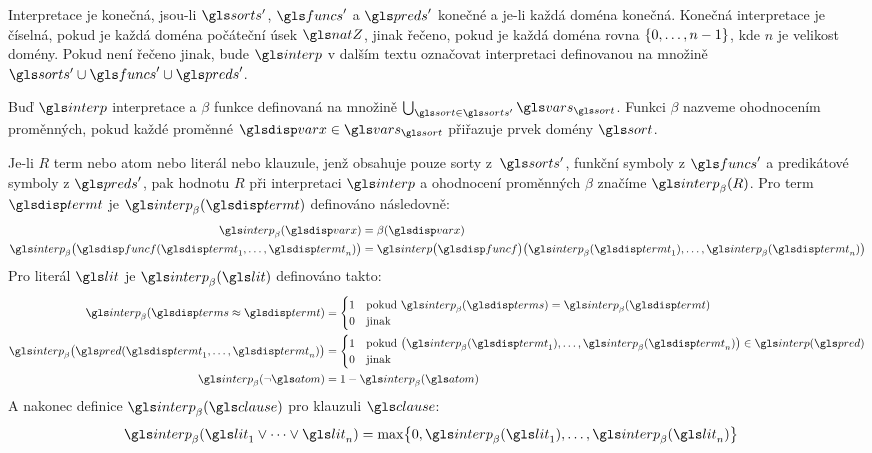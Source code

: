 Interpretace je konečná, jsou-li $\sorts'$, $\funcs'$ a $\preds'$
konečné a je-li každá doména konečná.
Konečná interpretace je číselná, pokud je každá doména
počáteční úsek $\natZ$, jinak řečeno, pokud je každá doména rovna
$\{ 0 , \ldots, n - 1 \}$, kde $n$ je velikost domény.
Pokud není řečeno jinak, bude
$\interp$ v dalším textu označovat interpretaci definovanou
na množině $\sorts' \cup \funcs' \cup \preds'$.

Buď $\interp$ interpretace a $\beta$ funkce definovaná na množině
$\bigcup_{\sort \in \sorts'} \vars_\sort$. Funkci $\beta$ nazveme ohodnocením
proměnných, pokud každé proměnné $\var \in \vars_\sort$ přiřazuje
prvek domény $\sort$.

Je-li $R$ term nebo atom nebo literál nebo klauzule, jenž
obsahuje pouze sorty z~$\sorts'$, funkční symboly z $\funcs'$ a
predikátové symboly z $\preds'$, pak
hodnotu $R$ při interpretaci $\interp$ a ohodnocení proměnných
$\beta$ značíme $\interp_\beta(R)$. Pro term $\term$ je $\interp_\beta(\term)$
definováno následovně:
\begin{align*}
\interp_\beta(\var) &= \beta(\var) \\
\interp_\beta\bigl(\func(\term_1 \comdots \term_n)\bigr) &=
  \interp\bigl(\func\bigr)\bigl(\interp_\beta(\term_1) \comdots
    \interp_\beta(\term_n)\bigr)
\end{align*}
Pro literál $\lit$ je $\interp_\beta(\lit)$ definováno takto:
\begin{align*}
\interp_\beta(\termS \approx \term) &=
  \begin{cases}
    1 & \text{pokud } \interp_\beta(\termS) = \interp_\beta(\term) \\
    0 & \text{jinak}
  \end{cases} \\
\interp_\beta\bigl(\pred(\term_1 \comdots \term_n)\bigr) &=
  \begin{cases}
    1 & \text{pokud }
      \bigl(\interp_\beta(\term_1) \comdots \interp_\beta(\term_n)\bigr)
      \in \interp(\pred) \\
    0 & \text{jinak}
  \end{cases} \\
\interp_\beta(\neg \atom) &= 1 - \interp_\beta(\atom)
\end{align*}
A nakonec definice $\interp_\beta(\clause)$ pro klauzuli $\clause$:
\begin{align*}
\interp_\beta(\lit_1 \vee \cdots \vee \lit_n) &=
  \max \bigl\{ 0, \interp_\beta(\lit_1) \comdots \interp_\beta(\lit_n) \bigr\}
\end{align*}

